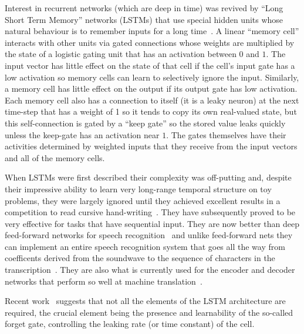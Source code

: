 \documentclass[]{article}
\begin{document}
Interest in recurrent networks (which are deep in time) was revived by
``Long Short Term Memory'' networks (LSTMs) that use special hidden units
whose natural behaviour is to remember inputs for a long
time~\citep{Hochreiter+Schmidhuber-1997}.  
A linear ``memory cell'' interacts with other units
via gated connections whose weights are multiplied by the state of a
logistic gating unit that has an activation between $0$ and $1$. The input
vector has little effect on the state of that cell if the cell's input
gate has a low activation so memory cells can learn to selectively ignore
the input.  Similarly, a memory cell has little effect on the output if its
output gate has low activation. Each memory cell also has a connection to
itself (it is a leaky neuron) at the next time-step that has a weight of 1 so it tends to copy its
own real-valued state, but this self-connection is gated by a ``keep gate'' so
the stored value leaks quickly unless the keep-gate has an activation
near $1$.  The gates themselves have their activities determined by
weighted inputs that they receive from the input vectors and all of the
memory cells.

When LSTMs were first described %
\citep{Hochreiter+Schmidhuber-1997} their complexity was off-putting
and, despite their impressive ability to learn very long-range temporal
structure on toy problems, they were largely ignored until they achieved
excellent results in a competition to read cursive
hand-writing~\citep{Graves-et-al-2009}. They have subsequently proved to be very
effective for tasks that have sequential input.  They are now better than
deep feed-forward networks for speech recognition~\citep{gravestimit} and
unlike feed-forward nets they can implement an entire speech recognition
system that goes all the way from coefficents derived from the soundwave to
the sequence of characters in the transcription~\citep{gravestimit}.  They
are also what is currently used for the encoder and decoder networks that
perform so well at machine
translation~\citep{Bahdanau-et-al-arxiv2014,Sutskever-et-al-NIPS2014}.

Recent work~\citep{Chung-et-al-NIPSDL2014-small,Yao-et-al-SLU-workshop2014} 
suggests that not all the elements of the LSTM
architecture are required, the crucial element being the presence and learnability 
of the so-called forget gate, controlling the leaking rate (or time constant) of the cell.
\end{document}
